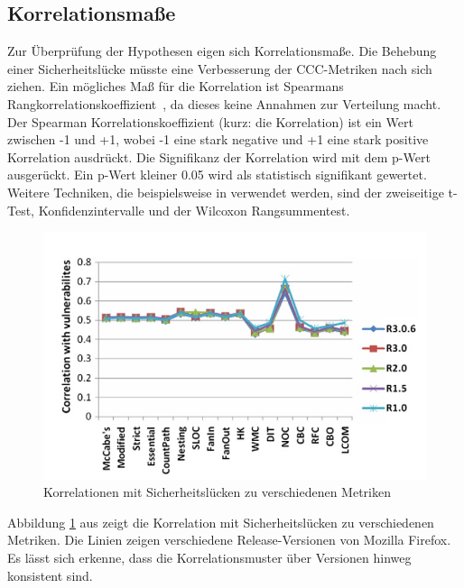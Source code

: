 \subsection{Korrelationsmaße}
Zur Überprüfung der Hypothesen eigen sich Korrelationsmaße.
Die Behebung einer Sicherheitslücke müsste eine Verbesserung der CCC-Metriken nach sich ziehen.
Ein mögliches Maß für die Korrelation ist Spearmans Rangkorrelationskoeffizient~\cite{alves_et_al,chowdhury_zulkernine_2010}, da dieses keine Annahmen zur Verteilung macht.
Der Spearman Korrelationskoeffizient (kurz: die Korrelation) ist ein Wert zwischen -1 und +1, wobei -1 eine stark negative und +1 eine stark positive Korrelation ausdrückt.
Die Signifikanz der Korrelation wird mit dem p-Wert ausgerückt.
Ein p-Wert kleiner 0.05 wird als statistisch signifikant gewertet.
Weitere Techniken, die beispielsweise in \cite{alves_et_al} verwendet werden, sind der zweiseitige t-Test, Konfidenzintervalle und der Wilcoxon Rangsummentest.
\begin{figure}
	\includegraphics[width=\textwidth]{img/vulnerability_correlations.png}
	\caption{Korrelationen mit Sicherheitslücken zu verschiedenen Metriken}
	\label{fig:correlations}
\end{figure}
Abbildung \ref{fig:correlations} aus \cite{chowdhury_zulkernine_2009} zeigt die Korrelation mit Sicherheitslücken zu verschiedenen Metriken.
Die Linien zeigen verschiedene Release-Versionen von Mozilla Firefox.
Es lässt sich erkenne, dass die Korrelationsmuster über Versionen hinweg konsistent sind\cite{chowdhury_zulkernine_2009}.

